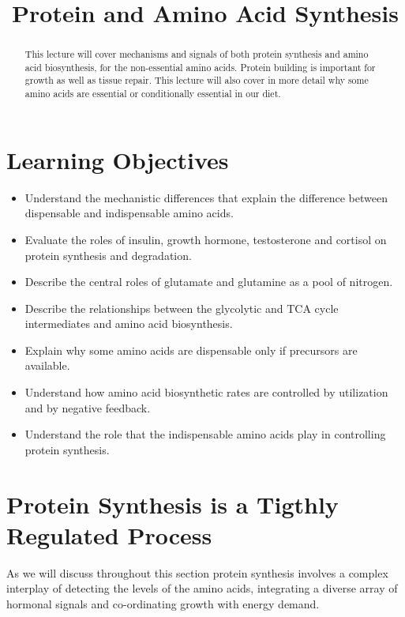 \documentclass{tufte-handout}
\title{Protein and Amino Acid Synthesis}
\author{}
\date{}  %
\begin{document}
\maketitle%

\begin{abstract}
\noindent This lecture will cover mechanisms and signals of both protein synthesis and amino acid biosynthesis, for the non-essential amino acids.  Protein building is important for growth as well as tissue repair.  This lecture will also cover in more detail why some amino acids are essential or conditionally essential in our diet.
\end{abstract}

\tableofcontents

\pagebreak
\section{Learning Objectives}

\begin{itemize}
\item Understand the mechanistic differences that explain the difference between dispensable and indispensable amino acids.
\item Evaluate the roles of insulin, growth hormone, testosterone and cortisol on protein synthesis and degradation.
\item Describe the central roles of glutamate and glutamine as a pool of nitrogen.
\item Describe the relationships between the glycolytic and TCA cycle intermediates and amino acid biosynthesis.
\item Explain why some amino acids are dispensable only if precursors are available.
\item Understand how amino acid biosynthetic rates are controlled by utilization and by negative feedback.
\item Understand the role that the indispensable amino acids play in controlling protein synthesis.
\end{itemize}

\section{Protein Synthesis is a Tigthly Regulated Process}

As we will discuss throughout this section protein synthesis involves a complex interplay of detecting the levels of the amino acids, integrating a diverse array of hormonal signals and co-ordinating growth with energy demand.
\end{document}
